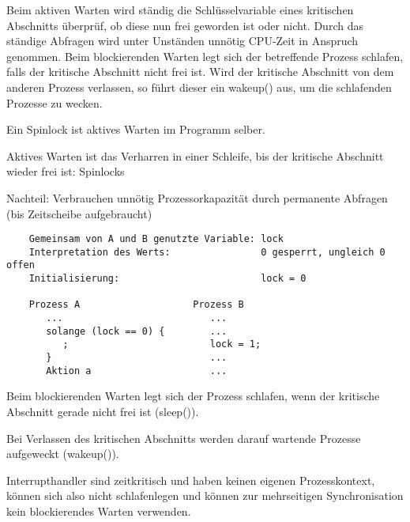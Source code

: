 \begin{answer}
Beim aktiven Warten wird ständig die Schlüsselvariable eines kritischen Abschnitts überprüf, ob diese nun frei geworden ist oder nicht. Durch das ständige Abfragen wird unter Unständen unnötig CPU-Zeit in Anspruch genommen.
Beim blockierenden Warten legt sich der betreffende Prozess schlafen, falls der kritische Abschnitt nicht frei ist. Wird der kritische Abschnitt von dem anderen Prozess verlassen, so führt dieser ein wakeup() aus, um die schlafenden Prozesse zu wecken.
\end{answer}

\begin{answer}
Ein Spinlock ist aktives Warten im Programm selber.
\end{answer}

\begin{answer}
Aktives Warten ist das Verharren in einer Schleife, bis der kritische Abschnitt wieder frei ist: Spinlocks

Nachteil: Verbrauchen unnötig Prozessorkapazität durch permanente Abfragen (bis Zeitscheibe aufgebraucht)

\begin{verbatim}
    Gemeinsam von A und B genutzte Variable: lock
    Interpretation des Werts:                0 gesperrt, ungleich 0 offen 
    Initialisierung:                         lock = 0
           
    Prozess A                    Prozess B
       ...                          ...
       solange (lock == 0) {        ...
          ;                         lock = 1;
       }                            ...
       Aktion a                     ...
\end{verbatim}
\end{answer}

\begin{answer}
Beim blockierenden Warten legt sich der Prozess schlafen, wenn der kritische Abschnitt gerade nicht frei ist (sleep()).

Bei Verlassen des kritischen Abschnitts werden darauf wartende Prozesse aufgeweckt (wakeup()).

Interrupthandler sind zeitkritisch und haben keinen eigenen Prozesskontext, können sich also nicht schlafenlegen und können zur mehrseitigen Synchronisation kein blockierendes Warten verwenden.
\end{answer}


